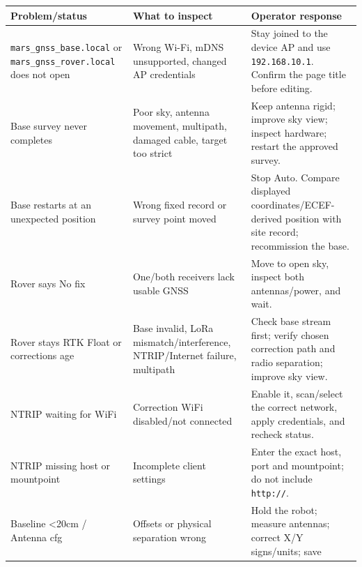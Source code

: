 \documentclass[
  10pt,
  letterpaper,
  openany]{report}
\newcounter{none} %
\begin{document}
{\def\LTcaptype{none} %
\begin{longtable}[]{@{}
  >{\raggedright\arraybackslash}p{}
  >{\raggedright\arraybackslash}p{}
  >{\raggedright\arraybackslash}p{}@{}}
\toprule\noalign{}
\begin{minipage}[b]{\linewidth}\raggedright
Problem/status
\end{minipage} & \begin{minipage}[b]{\linewidth}\raggedright
What to inspect
\end{minipage} & \begin{minipage}[b]{\linewidth}\raggedright
Operator response
\end{minipage} \\
\midrule\noalign{}
\endhead
\bottomrule\noalign{}
\endlastfoot
\texttt{mars\_gnss\_base.local} or \texttt{mars\_gnss\_rover.local} does
not open & Wrong Wi-Fi, mDNS unsupported, changed AP credentials & Stay
joined to the device AP and use \texttt{192.168.10.1}. Confirm the page
title before editing. \\
Base survey never completes & Poor sky, antenna movement, multipath,
damaged cable, target too strict & Keep antenna rigid; improve sky view;
inspect hardware; restart the approved survey. \\
Base restarts at an unexpected position & Wrong fixed record or survey
point moved & Stop Auto. Compare displayed coordinates/ECEF-derived
position with site record; recommission the base. \\
Rover says No fix & One/both receivers lack usable GNSS & Move to open
sky, inspect both antennas/power, and wait. \\
Rover stays RTK Float or corrections age & Base invalid, LoRa
mismatch/interference, NTRIP/Internet failure, multipath & Check base
stream first; verify chosen correction path and radio separation;
improve sky view. \\
NTRIP waiting for WiFi & Correction WiFi disabled/not connected & Enable
it, scan/select the correct network, apply credentials, and recheck
status. \\
NTRIP missing host or mountpoint & Incomplete client settings & Enter
the exact host, port and mountpoint; do not include \texttt{http://}. \\
Baseline \textless20cm / Antenna cfg & Offsets or physical separation
wrong & Hold the robot; measure antennas; correct X/Y signs/units; save

\end{longtable}}
\end{document}
